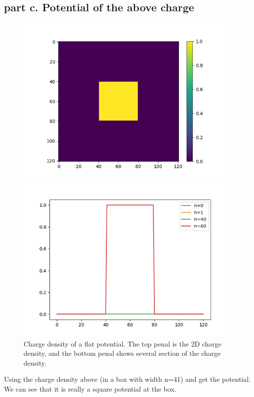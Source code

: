 \documentclass[showpacs, oneside, onecolumn, prl, amsmath, amssymb, nofootinbib, superscriptaddress, notitlepage]{revtex4-1}
\newcommand\bfig{\begin{figure}}
\newcommand\efig{\end{figure}}
\begin{document}
~~~~

~~~~

\subsection{part c. Potential of the above charge}

\bfig
	\centering
	\subfigure
	{\begin{minipage}[b]{1\textwidth}
	\includegraphics[scale=0.9]{7-2-3-3.png}
	\end{minipage}}
	\subfigure
	{\begin{minipage}[b]{1\textwidth}
	\includegraphics[scale=0.9]{7-2-3-4.png}
	\end{minipage}}
	\caption{Charge density of a flat potential. The top penal is the 2D charge density, and the bottom penal shows several section of the charge density.}
	\label{7-2-2}
\efig

Using the charge density above (in a box with width n=41) and get the potential. We can see that it is really a square potential at the box.
\end{document}
